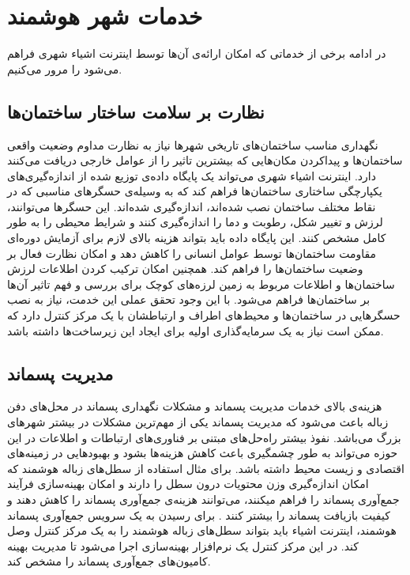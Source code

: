   \section{خدمات شهر هوشمند}
    در ادامه برخی از خدماتی که امکان ارائه‌ی آن‌ها توسط اینترنت اشیاء شهری فراهم می‌شود را مرور می‌کنیم.
    \subsection{نظارت بر سلامت ساختار ساختمان‌ها}
      نگهداری مناسب ساختمان‌های تاریخی شهر‌ها نیاز به نظارت مداوم وضعیت واقعی ساختمان‌ها و پیدا‌کردن‌ مکان‌هایی که بیشترین تاثیر را از عوامل خارجی دریافت می‌کنند دارد.
      اینترنت اشیاء شهری می‌تواند یک پایگاه داده‌ی توزیع شده از اندازه‌گیری‌های یکپارچگی ساختاری ساختمان‌ها فراهم ‌کند که به وسیله‌ی حسگر‌های مناسبی که در نقاط مختلف ساختمان نصب شده‌اند، اندازه‌گیری شده‌اند.
      این حسگر‌ها می‌توانند، لرزش و تغییر شکل، رطوبت و دما را اندازه‌گیری کنند و شرایط محیطی را به طور کامل مشخص کنند\cite{lynch2006summary}.
      این پایگاه داده باید بتواند هزینه بالای لازم برای آزمایش دوره‌ای مقاومت ساختمان‌ها توسط عوامل انسانی را کاهش دهد و امکان نظارت فعال بر وضعیت ساختمان‌ها را فراهم کند.
      همچنین امکان ترکیب کردن اطلاعات لرزش ساختمان‌ها و اطلاعات مربوط به زمین لرزه‌های کوچک برای بررسی و فهم تاثیر آن‌ها بر ساختمان‌ها فراهم می‌شود.
      با این وجود تحقق عملی این خدمت، نیاز به نصب حسگر‌هایی در ساختمان‌ها و محیط‌های اطراف و ارتباطشان با یک مرکز کنترل دارد که ممکن است نیاز به یک سرمایه‌گذاری اولیه برای ایجاد این زیرساخت‌ها داشته باشد.

    \subsection{مدیریت پسماند}
      هزینه‌ی بالای خدمات مدیریت پسماند و مشکلات نگهداری پسماند در محل‌های دفن زباله باعث می‌شود که مدیریت پسماند یکی از مهم‌ترین مشکلات در بیشتر شهر‌های بزرگ می‌باشد.
      نفوذ بیشتر راه‌حل‌های مبتنی بر فناوری‌های ارتباطات و اطلاعات در این حوزه می‌تواند به طور چشمگیری باعث کاهش هزینه‌ها بشود و بهبود‌هایی در زمینه‌های اقتصادی و زیست محیط داشته باشد.
      برای مثال استفاده از سطل‌های زباله هوشمند که امکان اندازه‌گیری وزن محتویات درون سطل را دارند و امکان بهینه‌سازی فرآیند جمع‌آوری پسماند را فراهم میکنند، می‌توانند هزینه‌ی جمع‌آوری پسماند را کاهش دهند و کیفیت بازیافت پسماند را بیشتر کنند \cite{nuortio2006improved}.
      برای رسیدن به یک سرویس جمع‌آوری پسماند هوشمند، اینترنت اشیاء باید بتواند سطل‌های زباله هوشمند را به یک مرکز کنترل وصل کند.
      در این مرکز کنترل یک نرم‌افزار بهینه‌سازی اجرا می‌شود تا مدیریت بهینه کامیون‌های جمع‌آوری پسماند را مشخص کند.

